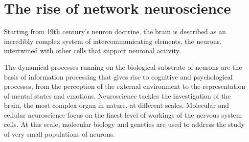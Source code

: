 
\section{The rise of network neuroscience}
Starting from 19th century’s neuron doctrine, the brain is described as an incredibly complex system of intercommunicating elements, the neurons, intertwined with other cells that support neuronal activity.

The dynamical processes running on the biological substrate of neurons are the basis of information processing that gives rise to cognitive and psychological processes, from the perception of the external environment to the representation of mental states and emotions.
Neuroscience tackles the investigation of the brain, the most complex organ in nature, at different scales.
Molecular and cellular neuroscience focus on the finest level of workings of the nervous system cells.
At this scale, molecular biology and genetics are used to address the study of very small populations of neurons.

